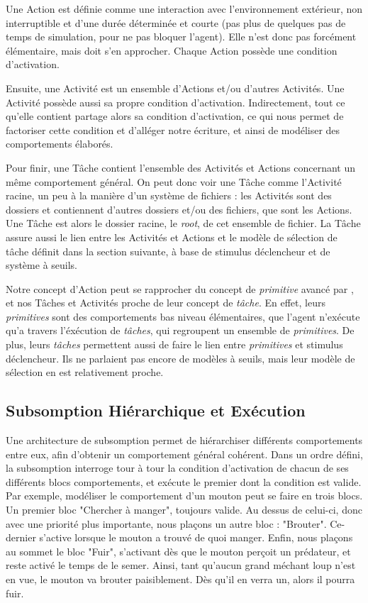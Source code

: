 			Une Action est définie comme une interaction avec l'environnement extérieur, non interruptible et d'une durée déterminée et courte (pas plus de quelques pas de temps de simulation, pour ne pas bloquer l'agent). Elle n'est donc pas forcément élémentaire, mais doit s'en approcher. Chaque Action possède une condition d'activation.
			
			Ensuite, une Activité est un ensemble d'Actions et/ou d'autres Activités. Une Activité possède aussi sa propre condition d'activation. Indirectement, tout ce qu'elle contient partage alors sa condition d'activation, ce qui nous permet de factoriser cette condition et d'alléger notre écriture, et ainsi de modéliser des comportements élaborés.
			
			Pour finir, une Tâche contient l'ensemble des Activités et Actions concernant un même comportement général. On peut donc voir une Tâche comme l'Activité racine, un peu à la manière d'un système de fichiers : les Activités sont des dossiers et contiennent d'autres dossiers et/ou des fichiers, que sont les Actions. Une Tâche est alors le dossier racine, le \textit{root}, de cet ensemble de fichier. La Tâche assure aussi le lien entre les Activités et Actions et le modèle de sélection de tâche définit dans la section suivante, à base de stimulus déclencheur et de système à seuils.
			
			Notre concept d'Action peut se rapprocher du concept de \textit{primitive} avancé par \cite{drogoul_multi-agent_1992}, et nos Tâches et Activités proche de leur concept de \textit{tâche}. En effet, leurs \textit{primitives} sont des comportements bas niveau élémentaires, que l'agent n'exécute qu'a travers l'éxécution de \textit{tâches}, qui regroupent un ensemble de \textit{primitives}. De plus, leurs \textit{tâches} permettent aussi de faire le lien entre \textit{primitives} et stimulus déclencheur. Ils ne parlaient pas encore de modèles à seuils, mais leur modèle de sélection en est relativement proche.
			
		\subsection{Subsomption Hiérarchique et Exécution}
		
			Une architecture de subsomption permet de hiérarchiser différents comportements entre eux, afin d'obtenir un comportement général cohérent\cite{brooks_robust_1986}. Dans un ordre défini, la subsomption interroge tour à tour la condition d'activation de chacun de ses différents blocs comportements, et exécute le premier dont la condition est valide. Par exemple, modéliser le comportement d'un mouton peut se faire en trois blocs. Un premier bloc "Chercher à manger", toujours valide. Au dessus de celui-ci, donc avec une priorité plus importante, nous plaçons un autre bloc : "Brouter". Ce-dernier s'active lorsque le mouton a trouvé de quoi manger. Enfin, nous plaçons au sommet le bloc "Fuir", s'activant dès que le mouton perçoit un prédateur, et reste activé le temps de le semer. Ainsi, tant qu'aucun grand méchant loup n'est en vue, le mouton va brouter paisiblement. Dès qu'il en verra un, alors il pourra fuir.
			
